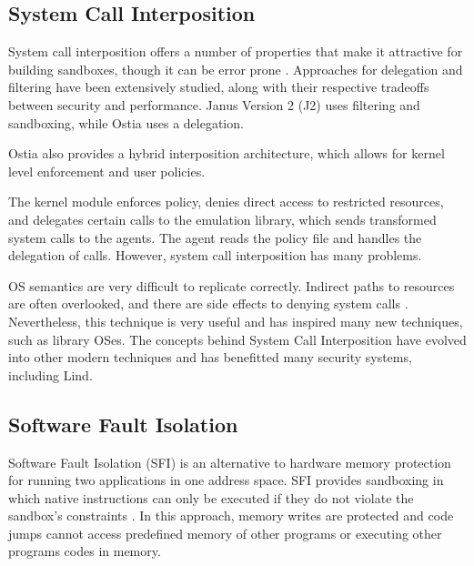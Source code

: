 \subsection{System Call Interposition}

System call interposition offers a number of properties that make it attractive for building sandboxes, though it can be error prone \cite{SCI-04}. Approaches for delegation and filtering have been extensively studied, 
along with their respective tradeoffs between security and performance. 
Janus Version 2 (J2) \cite{Janus0:96, Janus:99} uses filtering and sandboxing, while Ostia \cite{SCI-04} uses a delegation. 

Ostia also provides a hybrid interposition architecture, which allows for kernel level enforcement and user policies. 

The kernel module enforces policy, denies direct access to restricted resources, 
and delegates certain calls to the emulation library, which sends transformed system calls to the agents. 
The agent reads the policy file and handles the delegation of calls. However, system call interposition has many problems.

OS semantics are very difficult to replicate correctly. Indirect paths to resources are often overlooked, 
and there are side effects to denying system calls \cite{Problems-SCI}. 
Nevertheless, this technique is very useful and has inspired many new techniques, such as library OSes. 
The concepts behind System Call Interposition have evolved into other modern techniques 
and has benefitted many security systems, including Lind. 

\subsection{Software Fault Isolation}
Software Fault Isolation (SFI) is an alternative to hardware memory protection for running two applications in one address space. SFI provides sandboxing in which native instructions can only be executed if they do not violate the sandbox's constraints \cite{SFI:93}. In this approach, memory writes are protected and code jumps  cannot access predefined memory of other programs or executing other programs codes in memory. 

